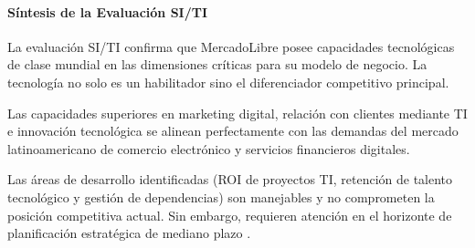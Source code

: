 \paragraph{Síntesis de la Evaluación SI/TI}

La evaluación SI/TI confirma que MercadoLibre posee capacidades tecnológicas de clase mundial en las dimensiones críticas para su modelo de negocio. La tecnología no solo es un habilitador sino el diferenciador competitivo principal.

Las capacidades superiores en marketing digital, relación con clientes mediante TI e innovación tecnológica se alinean perfectamente con las demandas del mercado latinoamericano de comercio electrónico y servicios financieros digitales.

Las áreas de desarrollo identificadas (ROI de proyectos TI, retención de talento tecnológico y gestión de dependencias) son manejables y no comprometen la posición competitiva actual. Sin embargo, requieren atención en el horizonte de planificación estratégica de mediano plazo \autocite{porter1985, teece2007, grant2016}.
